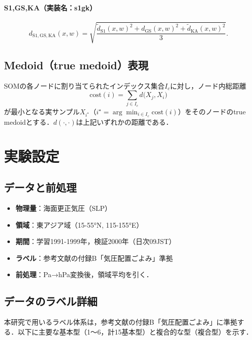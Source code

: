 \documentclass{jarticle}
\theoremstyle{definition}
\begin{document}
\paragraph{S1,GS,KA（実装名：s1gk）}
\begin{equation}
d_{\mathrm{S1,GS,KA}}(x,w)=\sqrt{\frac{\tilde d_{\mathrm{S1}}(x,w)^2+d_{\mathrm{GS}}(x,w)^2+\tilde d_{\mathrm{KA}}(x,w)^2}{3}}.
\end{equation}

\subsection{Medoid（true medoid）表現}
SOMの各ノードに割り当てられたインデックス集合$I_c$に対し，ノード内総距離
\begin{equation}
\mathrm{cost}(i)=\sum_{j\in I_c} d\bigl(X_j, X_i\bigr)
\end{equation}
が最小となる実サンプル$X_{i^\star}$（$i^\star=\arg\min_{i\in I_c}\mathrm{cost}(i)$）をそのノードのtrue medoidとする．$d(\cdot,\cdot)$は上記いずれかの距離である．

\section{実験設定}
\subsection{データと前処理}
\begin{itemize}
\item \textbf{物理量}：海面更正気圧（SLP）
\item \textbf{領域}：東アジア域（15-55°N, 115-155°E）
\item \textbf{期間}：学習1991-1999年，検証2000年（日次09JST）
\item \textbf{ラベル}：参考文献\cite{吉野2002日本の気候}の付録B「気圧配置ごよみ」準拠
\item \textbf{前処理}：Pa→hPa変換後，領域平均を引く．
\end{itemize}
\subsection{データのラベル詳細}
本研究で用いるラベル体系は，参考文献\cite{吉野2002日本の気候}の付録B「気圧配置ごよみ」に準拠する．以下に主要な基本型（1〜6，計15基本型）と複合的な型（複合型）を示す．
\end{document}
